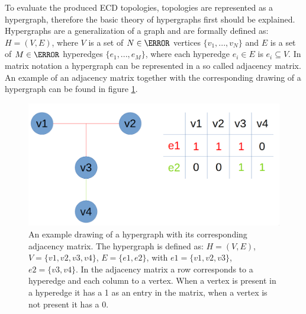 To evaluate the produced \ac{ECD} topologies, topologies are represented as a hypergraph, therefore the basic theory of hypergraphs first should be explained.
Hypergraphs are a generalization of a graph and are formally defined as:
$H = (V, E)$, where $V$ is a set of $N \in \N$ vertices $\{v_1,...,v_N\}$ and $E$ is a set of $M \in \N$ hyperedges $\{e_1,...,e_M\}$, where each hyperedge $e_i \in E$ is $e_i \subseteq V$. \cite{hypergraph_def}
In matrix notation a hypergraph can be represented in a so called adjacency matrix.
An example of an adjacency matrix together with the corresponding drawing of a hypergraph can be found in figure \ref{fig:hypergraph_adjacency}.

\begin{figure}
\begin{center}
    \includegraphics[width=13cm]{imgs/hypergraph_adjacency.png}
    \caption{An example drawing of a hypergraph with its corresponding adjacency matrix. The hypergraph is defined as: $H = (V, E)$, $V = \{v1, v2, v3, v4\}$, $E = \{e1, e2\}$, with $e1 = \{v1, v2, v3\}$, $e2 = \{v3, v4\}$. In the adjacency matrix a row corresponds to a hyperedge and each column to a vertex. When a vertex is present in a hyperedge it has a 1 as an entry in the matrix, when a vertex is not present it has a 0.}
    \label{fig:hypergraph_adjacency}
\end{center}
\end{figure}
